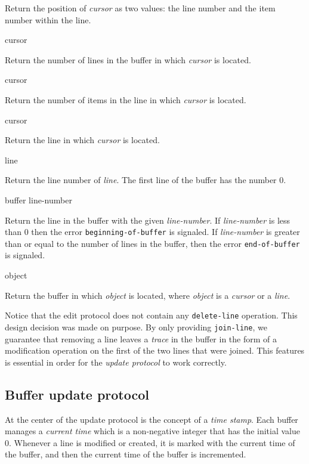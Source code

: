 Return the position of \textit{cursor} as two values: the line number
and the item number within the line. 

 {cursor}

Return the number of lines in the buffer in which \textit{cursor} is
located.

 {cursor}

Return the number of items in the line in which \textit{cursor} is
located.

 {cursor}

Return the line in which \textit{cursor} is located. 

 {line}

Return the line number of \textit{line}.  The first line of the buffer
has the number $0$. 

 {buffer line-number}

Return the line in the buffer with the given \textit{line-number}.  If
\textit{line-number} is less than $0$ then the error
\texttt{beginning-of-buffer} is signaled.  If \textit{line-number} is
greater than or equal to the number of lines in the buffer, then the
error \texttt{end-of-buffer} is signaled.

 {object}

Return the buffer in which \textit{object} is located, where
\textit{object} is a \emph{cursor} or a \emph{line}.

Notice that the edit protocol does not contain any
\texttt{delete-line} operation.  This design decision was made on
purpose.  By only providing \texttt{join-line}, we guarantee that
removing a line leaves a \emph{trace} in the buffer in the form of a
modification operation on the first of the two lines that were
joined.  This features is essential in order for the \emph{update
  protocol} to work correctly.

\subsection{Buffer update protocol}

At the center of the update protocol is the concept of a \emph{time
  stamp}.  Each buffer manages a \emph{current time} which is a
non-negative integer that has the initial value $0$.  Whenever a line
is modified or created, it is marked with the current time of the
buffer, and then the current time of the buffer is incremented.

